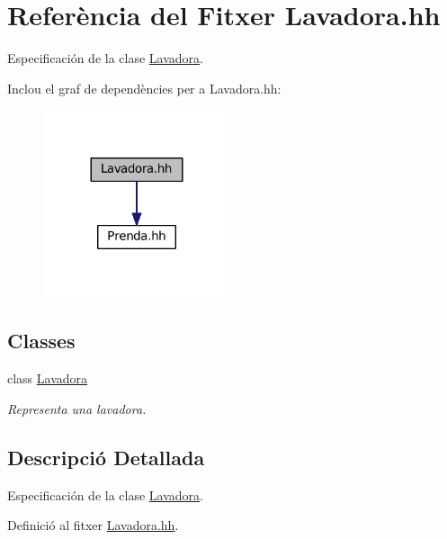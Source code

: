 \hypertarget{_lavadora_8hh}{\section{Referència del Fitxer Lavadora.\+hh}
\label{_lavadora_8hh}
}


Especificación de la clase \hyperlink{class_lavadora}{Lavadora}.  


Inclou el graf de dependències per a Lavadora.\+hh\+:
\nopagebreak
\begin{figure}[H]
\begin{center}
\leavevmode
\includegraphics[width=156pt]{_lavadora_8hh__incl}
\end{center}
\end{figure}
\subsection*{Classes}
\begin{DoxyCompactItemize}
\item 
class \hyperlink{class_lavadora}{Lavadora}
\begin{DoxyCompactList}\small\item\em Representa una lavadora. \end{DoxyCompactList}\end{DoxyCompactItemize}


\subsection{Descripció Detallada}
Especificación de la clase \hyperlink{class_lavadora}{Lavadora}. 



Definició al fitxer \hyperlink{_lavadora_8hh_source}{Lavadora.\+hh}.

